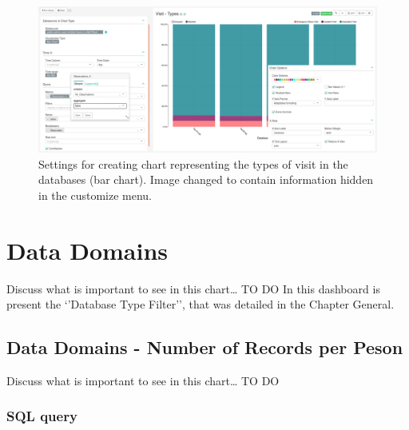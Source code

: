 \documentclass[]{book}
\begin{document}
\begin{figure}
\includegraphics[width=1\linewidth]{images/visitTypes} \caption{Settings for creating chart representing the types of visit in the databases (bar chart). Image changed to contain information hidden in the customize menu.}\label{fig:visitTypes33}
\end{figure}

\chapter{Data Domains}\label{data-domains}

Discuss what is important to see in this chart\ldots{} TO DO In this
dashboard is present the `'Database Type Filter'', that was detailed in
the Chapter General.

\section{Data Domains - Number of Records per
Peson}\label{data-domains---number-of-records-per-peson}

Discuss what is important to see in this chart\ldots{} TO DO

\subsection{SQL query}\label{sql-query-18}
\end{document}
